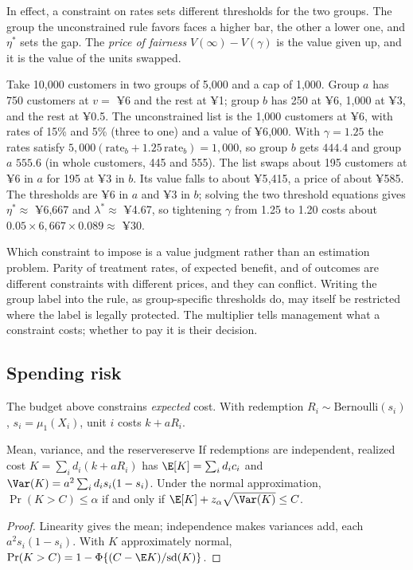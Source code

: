 \documentclass[11pt]{article}
\begin{document}
In effect, a constraint on rates sets different thresholds for the two groups. The group the unconstrained rule
favors faces a higher bar, the other a lower one, and $\eta^\ast$ sets the gap. The \emph{price of fairness}
$V(\infty) - V(\gamma)$ is the value given up, and it is the value of the units swapped.

Take 10{,}000 customers in two groups of 5{,}000 and a cap of 1{,}000. Group $a$ has 750 customers at $v = $ ¥6 and the rest
at ¥1; group $b$ has 250 at ¥6, 1{,}000 at ¥3, and the rest at ¥0.5. The unconstrained list is the 1{,}000 customers at ¥6,
with rates of 15\% and 5\% (three to one) and a value of ¥6{,}000. With $\gamma = 1.25$ the rates satisfy
$5{,}000(\text{rate}_b + 1.25\,\text{rate}_b) = 1{,}000$, so group $b$ gets $444.4$ and group $a$ $555.6$ (in whole customers,
445 and 555). The list swaps about 195 customers at ¥6 in $a$ for 195 at ¥3 in $b$. Its value falls to about ¥5{,}415, a
price of about ¥585. The thresholds are ¥6 in $a$ and ¥3 in $b$; solving the two threshold equations gives $\eta^\ast \approx$ ¥6{,}667 and $\lambda^\ast \approx$ ¥4.67, so tightening $\gamma$ from 1.25 to 1.20 costs about
$0.05 \times 6{,}667 \times 0.089 \approx$ ¥30.

Which constraint to impose is a value judgment rather than an estimation problem. Parity of treatment rates, of expected
benefit, and of outcomes are different constraints with different prices, and they can conflict. Writing the group label
into the rule, as group-specific thresholds do, may itself be restricted where the label is legally protected. The
multiplier tells management what a constraint costs; whether to pay it is their decision.

\subsection{Spending risk}

The budget above constrains \emph{expected} cost. With redemption $R_i \sim \text{Bernoulli}(s_i)$, $s_i = \mu_1(X_i)$, unit $i$
costs $k + aR_i$.

\begin{prop}{Mean, variance, and the reserve}{reserve}
If redemptions are independent, realized cost $K = \sum_i d_i(k + aR_i)$ has $\E[K] = \sum_i d_ic_i$ and
$\Var(K) = a^2\sum_i d_is_i(1-s_i)$. Under the normal approximation, $\Pr(K > C) \le \alpha$ if and only if
$\E[K] + z_\alpha\sqrt{\Var(K)} \le C$.
\end{prop}
\begin{proof}
Linearity gives the mean; independence makes variances add, each $a^2s_i(1-s_i)$. With $K$ approximately normal,
$\Pr(K > C) = 1 - \Phi\{(C - \E K)/\text{sd}(K)\}$.
\end{proof}
\end{document}
